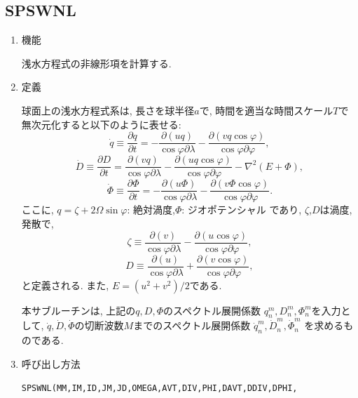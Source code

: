 \documentclass[a4j,fleqn]{jarticle}
\begin{document}
\subsection{SPSWNL}

\begin{enumerate}

\item 機能

浅水方程式の非線形項を計算する.

\item 定義

球面上の浅水方程式系は, 長さを球半径$a$で, 時間を適当な時間スケール$T$で
無次元化すると以下のように表せる:
\begin{equation}
\dot{q}\equiv\frac{\partial q}{\partial t}
=-\frac{\partial(uq)}{\cos\varphi\partial\lambda}
-\frac{\partial(vq\cos\varphi)}{\cos\varphi\partial\varphi},
\end{equation}
\begin{equation}
\dot{D}\equiv\frac{\partial D}{\partial t}
=\frac{\partial(vq)}{\cos\varphi\partial\lambda}
-\frac{\partial(uq\cos\varphi)}{\cos\varphi\partial\varphi}
-\nabla^2(E+\Phi),
\end{equation}
\begin{equation}
\dot{\Phi}\equiv\frac{\partial \Phi}{\partial t}
=-\frac{\partial(u\Phi)}{\cos\varphi\partial\lambda}
-\frac{\partial(v\Phi\cos\varphi)}{\cos\varphi\partial\varphi}.
\end{equation}
ここに, $q=\zeta+2\Omega\sin\varphi$: 絶対渦度,$\Phi$: ジオポテンシャル
であり, $\zeta$,$D$は渦度, 発散で,
\begin{equation}
\zeta\equiv
\frac{\partial(v)}{\cos\varphi\partial\lambda}
-\frac{\partial(u\cos\varphi)}{\cos\varphi\partial\varphi},
\end{equation}
\begin{equation}
D\equiv
\frac{\partial(u)}{\cos\varphi\partial\lambda}
+\frac{\partial(v\cos\varphi)}{\cos\varphi\partial\varphi},
\end{equation}
と定義される. また, $E=(u^2+v^2)/2$である.

本サブルーチンは, 上記の$q,D,\Phi$のスペクトル展開係数
$q^m_n,D^m_n,\Phi^m_n$を入力として, 
$\dot{q},\dot{D},\dot{\Phi}$の切断波数$M$までのスペクトル展開係数
$\dot{q}^m_n,\dot{D}^m_n,\dot{\Phi}^m_n$
を求めるものである.

\item 呼び出し方法 

{\tt SPSWNL(MM,IM,ID,JM,JD,OMEGA,AVT,DIV,PHI,DAVT,DDIV,DPHI,}\\
\hspace*{10em}{\tt RN,IT,T,Y,IP4,P4,R4,IP5,P5,R5,IA,A,Q,WS,WW)}
  

\end{enumerate}
\end{document}
